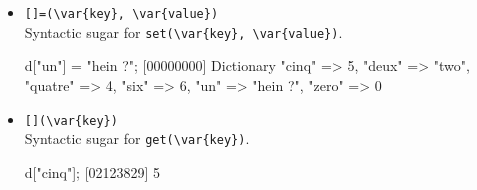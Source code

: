 \begin{itemize}
\item \lstinline|[]=(\var{key}, \var{value})|\\
  Syntactic sugar for \lstinline|set(\var{key}, \var{value})|.

\begin{urbiscript}[firstnumber=last]
d["un"] = "hein ?";
[00000000] Dictionary {"cinq" => 5, "deux" => "two", "quatre" => 4, "six" => 6, "un" => "hein ?", "zero" => 0}
\end{urbiscript}

\item \lstinline|[](\var{key})|\\
  Syntactic sugar for \lstinline|get(\var{key})|.

\begin{urbiscript}[firstnumber=last]
d["cinq"];
[02123829] 5
\end{urbiscript}

\end{itemize}


